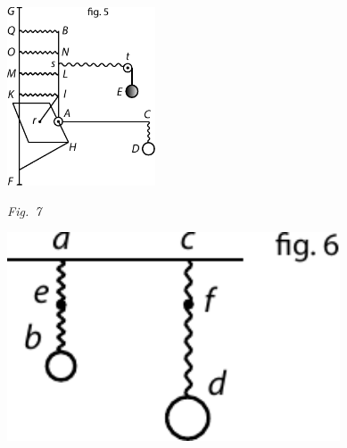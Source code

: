    \centerline{\includegraphics[width=0.33\textwidth]{gesamttex/edit_VIII,3/images/LH_37_03_073-074_d07.pdf}}%
  \vspace{0.5em}
  \centerline{\lbrack\textit{Fig.~7}\rbrack}\label{LH_37_03_074r_Fig.7}%
  \newpage
  \pstart  \noindent
\begin{minipage}[t]{0.33\textwidth}
\includegraphics[width=0.74\textwidth]{gesamttex/edit_VIII,3/images/LH_37_03_073-074_d08.pdf}
\end{minipage}
